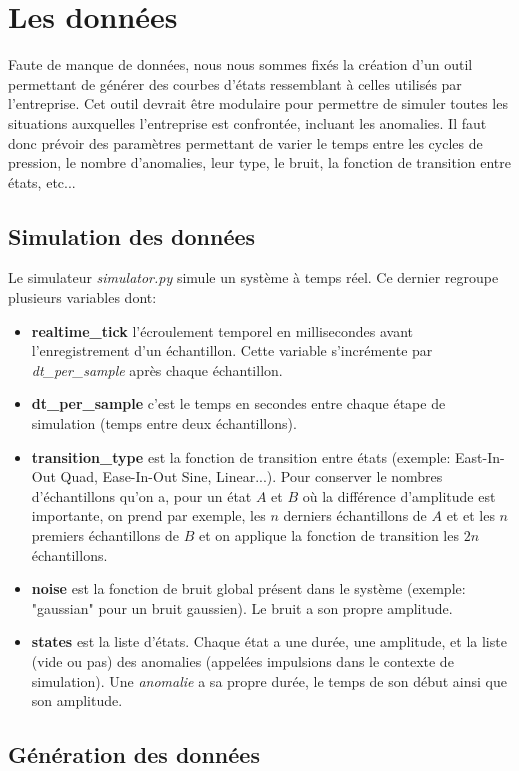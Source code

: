 \documentclass[french]{article}
\theoremstyle{mytheoremstyle}
\theoremstyle{mytheoremstyle}
\theoremstyle{myproblemstyle}
\begin{document}
    \section{Les données}
    Faute de manque de données, nous nous sommes fixés la  création d'un outil permettant de générer des courbes d'états ressemblant à celles utilisés par l'entreprise. Cet outil devrait être modulaire pour permettre de simuler toutes les situations auxquelles l'entreprise est confrontée, incluant les anomalies. Il faut donc prévoir des paramètres permettant de varier le temps entre les cycles de pression, le nombre d'anomalies, leur type, le bruit, la fonction de transition entre états, etc...
        \subsection{Simulation des données}
        Le simulateur \textit{simulator.py} simule un système à temps réel. Ce dernier regroupe plusieurs variables dont:
        \begin{itemize}[label={•}]
            \item \textbf{realtime\_tick} l'écroulement temporel en millisecondes avant l'enregistrement d'un échantillon. Cette variable s'incrémente par \textit{dt\_per\_sample} après chaque échantillon.
            \item \textbf{dt\_per\_sample} c'est le temps en secondes entre chaque étape de simulation (temps entre deux échantillons).
            \item \textbf{transition\_type} est la fonction de transition entre états (exemple: East-In-Out Quad, Ease-In-Out Sine, Linear...). Pour conserver le nombres d'échantillons qu'on a, pour un état $A$ et $B$ où la différence d'amplitude est importante, on prend par exemple, les $n$ derniers échantillons de $A$ et et les $n$ premiers échantillons de $B$ et on applique la fonction de transition les $2n$ échantillons.
            \item \textbf{noise} est la fonction de bruit global présent dans le système (exemple: "gaussian" pour un bruit gaussien). Le bruit a son propre amplitude. 
            \item \textbf{states} est la liste d'états. Chaque état a une durée, une amplitude, et la liste (vide ou pas) des anomalies (appelées impulsions dans le contexte de simulation). Une \textit{anomalie} a sa propre durée, le temps de son début ainsi que son amplitude.
        \end{itemize}
        \subsection{Génération des données}
\end{document}
